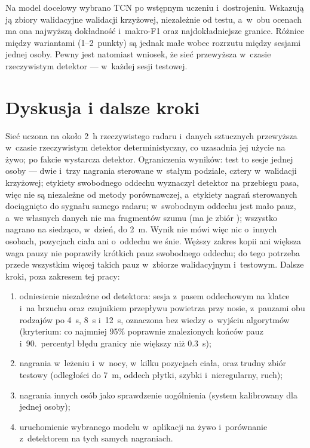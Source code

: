 \documentclass[12pt,a4paper,oneside]{report}
\begin{document}
Na model docelowy wybrano TCN po wstępnym uczeniu i~dostrojeniu. Wskazują ją zbiory
walidacyjne walidacji krzyżowej, niezależnie od testu, a~w~obu ocenach ma ona najwyższą dokładność
i~makro-F1 oraz najdokładniejsze granice. Różnice między wariantami (1--2~punkty) są jednak
małe wobec rozrzutu między sesjami jednej osoby. Pewny jest natomiast wniosek, że sieć
przewyższa w~czasie rzeczywistym detektor --- w~każdej sesji testowej.

\section{Dyskusja i dalsze kroki}
\label{sec:sieci-dyskusja}
Sieć uczona na około \SI{2}{h} rzeczywistego radaru i~danych sztucznych przewyższa
w~czasie rzeczywistym detektor deterministyczny, co uzasadnia jej użycie na żywo; po fakcie
wystarcza detektor. Ograniczenia wyników: test to sesje jednej osoby --- dwie i~trzy nagrania
sterowane w~stałym podziale, cztery w~walidacji krzyżowej; etykiety swobodnego oddechu wyznaczył detektor na przebiegu pasa, więc nie są
niezależne od metody porównawczej, a~etykiety nagrań sterowanych dociągnięto do sygnału
samego radaru; w~swobodnym oddechu jest mało pauz, a~we własnych danych nie ma fragmentów
szumu (ma je zbiór \cite{szymanski2025}); wszystko nagrano na siedząco, w~dzień, do
\SI{2}{m}. Wynik nie mówi więc nic o~innych osobach, pozycjach ciała ani o~oddechu we śnie.
Węższy zakres kopii ani większa waga pauzy nie poprawiły krótkich pauz swobodnego oddechu;
do tego potrzeba przede wszystkim więcej takich pauz w~zbiorze walidacyjnym i~testowym.
Dalsze kroki, poza zakresem tej pracy:
\begin{enumerate}
  \item odniesienie niezależne od detektora: sesja z~pasem oddechowym na klatce i~na brzuchu
  oraz czujnikiem przepływu powietrza przy nosie, z~pauzami obu rodzajów po \SI{4}{s}, \SI{8}{s}
  i~\SI{12}{s}, oznaczona bez wiedzy o~wyjściu algorytmów (kryterium: co najmniej 95\% poprawnie
  znalezionych końców pauz i~90.~percentyl błędu granicy nie większy niż \SI{0.3}{s});
  \item nagrania w~leżeniu i~w~nocy, w~kilku pozycjach ciała, oraz trudny zbiór testowy
  (odległości do \SI{7}{m}, oddech płytki, szybki i~nieregularny, ruch);
  \item nagrania innych osób jako sprawdzenie uogólnienia (system kalibrowany dla jednej osoby);
  \item uruchomienie wybranego modelu w~aplikacji na żywo i~porównanie z~detektorem na tych
  samych nagraniach.
\end{enumerate}
\end{document}
